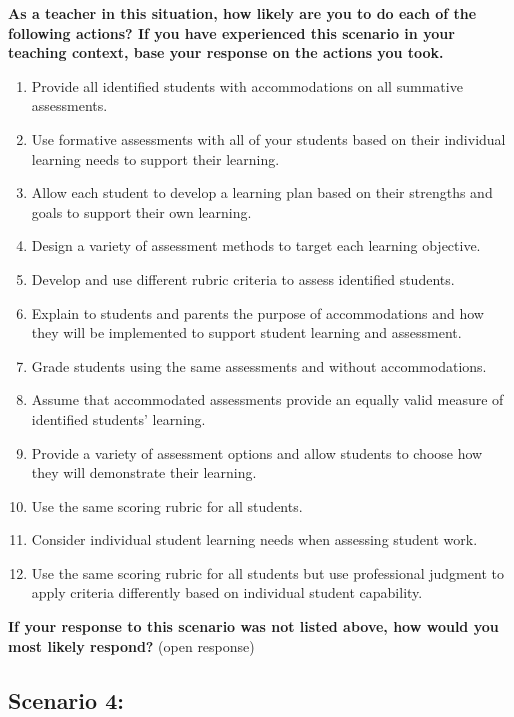\documentclass[
]{book}
\providecommand{\tightlist}{%
  \setlength{\itemsep}{0pt}\setlength{\parskip}{0pt}}
\begin{document}
\textbf{As a teacher in this situation, how likely are you to do each of the following actions? If you have experienced this scenario in your teaching context, base your response on the actions you took.}

\begin{enumerate}
\def\labelenumi{\arabic{enumi}.}
\tightlist
\item
  Provide all identified students with accommodations on all summative assessments.
\item
  Use formative assessments with all of your students based on their individual learning needs to support their learning.
\item
  Allow each student to develop a learning plan based on their strengths and goals to support their own learning.
\item
  Design a variety of assessment methods to target each learning objective.
\item
  Develop and use different rubric criteria to assess identified students.
\item
  Explain to students and parents the purpose of accommodations and how they will be implemented to support student learning and assessment.
\item
  Grade students using the same assessments and without accommodations.
\item
  Assume that accommodated assessments provide an equally valid measure of identified students' learning.
\item
  Provide a variety of assessment options and allow students to choose how they will demonstrate their learning.
\item
  Use the same scoring rubric for all students.
\item
  Consider individual student learning needs when assessing student work.
\item
  Use the same scoring rubric for all students but use professional judgment to apply criteria differently based on individual student capability.
\end{enumerate}

\textbf{If your response to this scenario was not listed above, how would you most likely respond?} (open response)

\hypertarget{section-1}{%
\subsection{}\label{section-1}}

\hypertarget{scenario-4-1}{%
\subsection{Scenario 4:}\label{scenario-4-1}}
\end{document}
